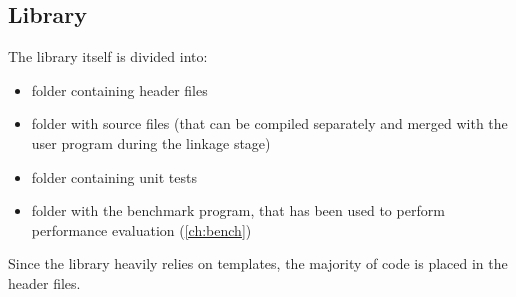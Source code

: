 \subsection{Library}
The library itself is divided into:
\begin{itemize}
\item [\pathname{include/numdb}] folder containing header files
\item [\pathname{lib}] folder with source files (that can be compiled separately and merged with the user program during the linkage stage)
\item [\pathname{test}] folder containing unit tests
\item [\pathname{benchmark}] folder with the benchmark program, that has been used to perform performance evaluation (\cref{ch:bench})
\end{itemize}
Since the library heavily relies on templates, the majority of code is placed in the header files.


